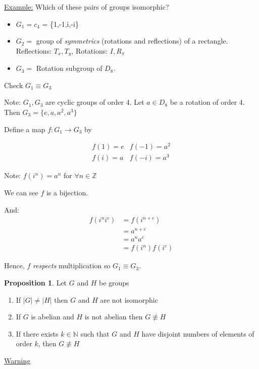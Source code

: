 \documentclass{article}
\theoremstyle{definition}
\newtheorem{proposition}{Proposition}
\begin{document}
\underline{Example:} Which of these pairs of groups isomorphic?
\begin{itemize}
  \item 
$G_1 = c_4$ = \{1,-1,i,-i\}
  \item
$G_2 = $ group of \emph{symmetrics} (rotations and reflections) of a rectangle.
Reflections: $T_x, T_y$, Rotations: $I, R_\pi$
  \item $G_3 = $ Rotation subgroup of $D_8$.
\end{itemize}

Check $G_1 \equiv G_3$

Note: $G_1, G_3$ are cyclic groups of order 4. Let $a \in D_8$ be a rotation of order 4. Then $G_3 = \{e,a,a^2, a^3\}$

Define a map $f:G_1 \rightarrow G_3$ by 

\begin{equation*}
  \begin{matrix}
    f(1)=e & f(-1) = a^2 \\
    f(i)=a & f(-i) = a^3
  \end{matrix}
  \label{}
\end{equation*}

Note: $f(i^n) = a^n$ for $\forall n \in \mathbb{Z}$

We can see $f$ is a bijection.

And: 
\begin{align*}
  f(i^ni^c) &= f(i^{n+c})\\
  &= a^{n+c} \\
  &= a^n a^c \\
  &= f(i^n)f(i^c)
\end{align*}

Hence, $f$ \emph{respects} multiplication so $G_1 \equiv G_3.$

\begin{proposition}
  Let $G$ and $H$ be groups 
  \begin{enumerate}
    \item If $|G| \neq |H|$ then $G$ and $H$ are not isomorphic
    \item If $G$ is abelian and $H$ is not abelian then $G \not\equiv H$
    \item If there exists $k \in \mathbb{N}$ such that $G$ and $H$ have disjoint numbers of elements of order $k$, then $G \not\equiv H$
  \end{enumerate}
\end{proposition}

\underline{Warning}
\end{document}
